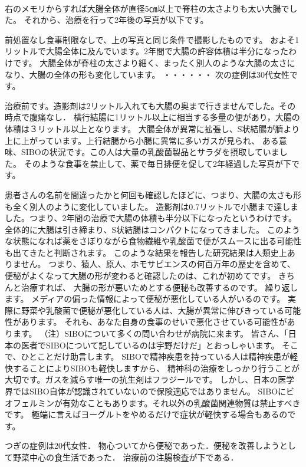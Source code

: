 　 

右のメモリからすれば大腸全体が直径5㎝以上で脊柱の太さよりも太い大腸でした。
それから、治療を行って2年後の写真が以下です。


前処置なし食事制限なしで、上の写真と同じ条件で撮影したものです。
およそ1リットルで大腸全体に及んでいます。2年間で大腸の許容体積は半分になったわけです。
大腸全体が脊柱の太さより細く、まったく別人のような大腸の太さになり、大腸の全体の形も変化しています。
・・・・・・
次の症例は30代女性です。

治療前です。造影剤は2リットル入れても大腸の奥まで行きませんでした。その時点で腹痛なし．
横行結腸に1リットル以上に相当する多量の便があり，大腸の体積は３リットル以上となります。
大腸全体が異常に拡張し、S状結腸が臍より上に上がっています。上行結腸から小腸に異常に多いガスが見られ、
ある意味、SIBOの状況です。この人は大量の乳酸菌製品とサラダを摂取していました。
そのような食事を禁止して、薬で毎日排便を促して2年経過した写真が下です。

患者さんの名前を間違ったかと何回も確認したほどに、つまり、大腸の太さも形も全く別人のように変化していました。
造影剤は0.7リットルで小腸まで達しました。つまり、2年間の治療で大腸の体積も半分以下になったというわけです。
全体的に大腸は引き締まり、S状結腸はコンパクトになってきました。
このような状態になれば薬をさぼりながら食物繊維や乳酸菌で便がスムースに出る可能性も出てきたと判断されます。
このような結果を報告した研究結果は人類史上ありません。
つまり、猿人、原人、ホモサピエンスの何百万年の歴史を含めて、
便秘がよくなって大腸の形が変わると確認したのは、これが初めてです。
きちんと治療すれば、
大腸の形が悪いためとする便秘も改善するのです。
繰り返します。
メディアの偏った情報によって便秘が悪化している人がいるのです。
実際に野菜や乳酸菌で便秘が悪化している人は、大腸が異常に伸びきっている可能性があります。
それも、あなた自身の食事のせいで悪化させている可能性があります。
（注）SIBOについて多くの問い合わせが病院に来ます。
皆さん、「日本の医者でSIBOについて記しているのは宇野だけだ」とおっしゃいます。
そこで、ひとことだけ助言します。
SIBOで精神疾患を持っている人は精神疾患が軽快することによりSIBOも軽快しますから、
精神科の治療をしっかり行うことが大切です。ガスを減らす唯一の抗生剤はフラジールです。
しかし、日本の医学界ではSIBO自体が認識されていないので保険適応ではありません。
SIBOにビオフェルミンが有効なこともあります。それ以外の乳酸菌関連物質は禁止すべきです。
極端に言えばヨーグルトをやめるだけで症状が軽快する場合もあるのです。

つぎの症例は20代女性．
物心ついてから便秘であった．便秘を改善しようとして野菜中心の食生活であった．
治療前の注腸検査が下である．

